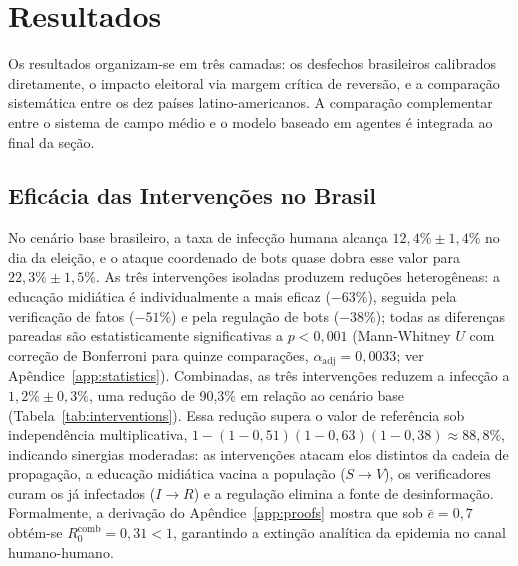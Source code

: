 \documentclass[12pt,a4paper]{article}
\theoremstyle{definition}
\theoremstyle{plain}
\begin{document}
\section{Resultados}
\label{sec:results}

Os resultados organizam-se em três camadas: os desfechos brasileiros calibrados diretamente, o impacto eleitoral via margem crítica de reversão, e a comparação sistemática entre os dez países latino-americanos. A comparação complementar entre o sistema de campo médio e o modelo baseado em agentes é integrada ao final da seção.

\subsection{Eficácia das Intervenções no Brasil}
\label{subsec:results_brasil}

No cenário base brasileiro, a taxa de infecção humana alcança $12{,}4\% \pm 1{,}4\%$ no dia da eleição, e o ataque coordenado de bots quase dobra esse valor para $22{,}3\% \pm 1{,}5\%$. As três intervenções isoladas produzem reduções heterogêneas: a educação midiática é individualmente a mais eficaz ($-63\%$), seguida pela verificação de fatos ($-51\%$) e pela regulação de bots ($-38\%$); todas as diferenças pareadas são estatisticamente significativas a $p < 0{,}001$ (Mann-Whitney $U$ com correção de Bonferroni para quinze comparações, $\alpha_{\text{adj}} = 0{,}0033$; ver Apêndice~\ref{app:statistics}). Combinadas, as três intervenções reduzem a infecção a $1{,}2\% \pm 0{,}3\%$, uma redução de 90,3\% em relação ao cenário base (Tabela~\ref{tab:interventions}). Essa redução supera o valor de referência sob independência multiplicativa, $1 - (1-0{,}51)(1-0{,}63)(1-0{,}38) \approx 88{,}8\%$, indicando sinergias moderadas: as intervenções atacam elos distintos da cadeia de propagação, a educação midiática vacina a população ($S \to V$), os verificadores curam os já infectados ($I \to R$) e a regulação elimina a fonte de desinformação. Formalmente, a derivação do Apêndice~\ref{app:proofs} mostra que sob $\bar{e} = 0{,}7$ obtém-se $R_0^{\text{comb}} = 0{,}31 < 1$, garantindo a extinção analítica da epidemia no canal humano-humano.
\end{document}
